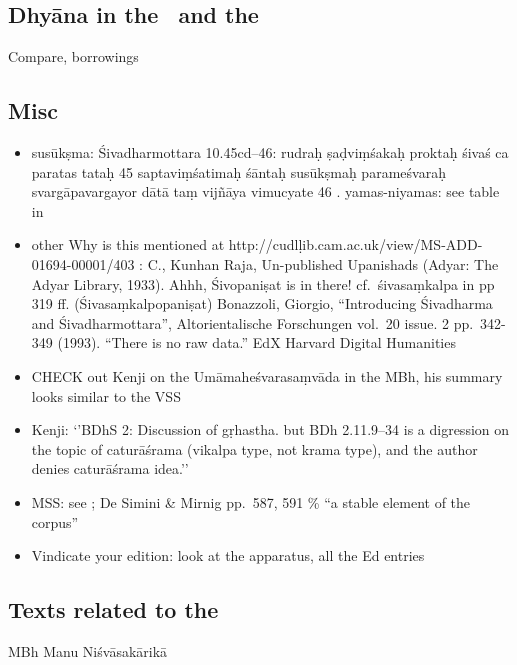 \documentclass[11pt]{book}
\begin{document}
\subsection{Dhyāna in the \VSS\ and the \DHARMP}

Compare, borrowings

\subsection{Misc}

\begin{itemize}
\item
  susūkṣma: Śivadharmottara 10.45cd--46: rudraḥ ṣaḍviṃśakaḥ proktaḥ
  śivaś ca paratas tataḥ \textbar{}\textbar{} 45 \textbar{}\textbar{}
  saptaviṃśatimaḥ śāntaḥ susūkṣmaḥ parameśvaraḥ \textbar{}
  svargāpavargayor dātā taṃ vijñāya vimucyate \textbar{}\textbar{} 46
  \textbar{}\textbar{}. yamas-niyamas: see table in 
\item
  other Why is this mentioned at
  http://cudlḷib.cam.ac.uk/view/MS-ADD-01694-00001/403 : C., Kunhan
  Raja, Un-published Upanishads (Adyar: The Adyar Library, 1933). Ahhh,
  Śivopaniṣat is in there! cf.~śivasaṃkalpa in pp 319 ff.
  (Śivasaṃkalpopaniṣat) Bonazzoli, Giorgio, ``Introducing Śivadharma and
  Śivadharmottara'', Altorientalische Forschungen vol.~20 issue. 2
  pp.~342-349 (1993). ``There is no raw data.'' EdX Harvard Digital
  Humanities
\item
  CHECK out Kenji on the Umāmaheśvarasaṃvāda in the MBh, his summary
  looks similar to the VSS
\item
  Kenji: `'BDhS 2: Discussion of gṛhastha. but BDh 2.11.9--34 is a
  digression on the topic of caturāśrama (vikalpa type, not krama type),
  and the author denies caturāśrama idea.''
\item
  MSS: see ; 
  De Simini \& Mirnig
  pp.~587, 591 \% ``a stable element of the corpus''
\item
  Vindicate your edition: look at the apparatus, all the Ed entries
\end{itemize}




\subsection{Texts related to the \VSS}

MBh
Manu
Niśvāsakārikā

\vfill
\pagebreak
\end{document}
